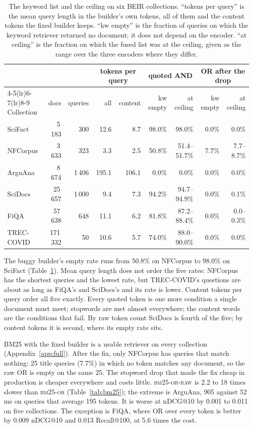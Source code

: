 \documentclass[11pt]{article}
\begin{document}
\begin{table}[h]
\centering
\small
\setlength{\tabcolsep}{4pt}
\begin{tabular}{lrrrrrrrr}
\toprule
 & & & \multicolumn{2}{c}{tokens per query} & \multicolumn{2}{c}{quoted AND} & \multicolumn{2}{c}{OR after the drop} \\
\cmidrule(lr){4-5}\cmidrule(lr){6-7}\cmidrule(lr){8-9}
Collection & docs & queries & all & content & kw empty & at ceiling & kw empty & at ceiling \\
\midrule
SciFact & 5\,183 & 300 & 12.6 & 8.7 & 98.0\% & 98.0\% & 0.0\% & 0.0\% \\
NFCorpus & 3\,633 & 323 & 3.3 & 2.5 & 50.8\% & 51.4--51.7\% & 7.7\% & 7.7--8.7\% \\
ArguAna & 8\,674 & 1\,406 & 195.1 & 106.1 & 0.0\% & 0.0\% & 0.0\% & 0.0\% \\
SciDocs & 25\,657 & 1\,000 & 9.4 & 7.3 & 94.2\% & 94.7--94.9\% & 0.0\% & 0.1\% \\
FiQA & 57\,638 & 648 & 11.1 & 6.2 & 81.8\% & 87.2--88.4\% & 0.0\% & 0.0--0.3\% \\
TREC-COVID & 171\,332 & 50 & 10.6 & 5.7 & 74.0\% & 88.0--90.0\% & 0.0\% & 0.0\% \\
\bottomrule
\end{tabular}
\caption{The keyword list and the ceiling on six BEIR collections. ``tokens per query'' is the mean query length in the builder's own tokens, all of them and the content tokens the fixed builder keeps. ``kw empty'' is the fraction of queries on which the keyword retriever returned no document; it does not depend on the encoder. ``at ceiling'' is the fraction on which the fused list was at the ceiling, given as the range over the three encoders where they differ.}
\label{tab:legs}
\end{table}

The buggy builder's empty rate runs from 50.8\% on NFCorpus to 98.0\% on SciFact (Table~\ref{tab:legs}). Mean query length does not order the five rates: NFCorpus has the shortest queries and the lowest rate, but TREC-COVID's questions are about as long as FiQA's and SciDocs's and its rate is lower. Content tokens per query order all five exactly. Every quoted token is one more condition a single document must meet; stopwords are met almost everywhere; the content words are the conditions that fail. By raw token count SciDocs is fourth of the five; by content tokens it is second, where its empty rate sits.

BM25 with the fixed builder is a usable retriever on every collection (Appendix~\ref{app:full}). After the fix, only NFCorpus has queries that match nothing: 25 title queries (7.7\%) in which no token matches any document, so the raw OR is empty on the same 25. The stopword drop that made the fix cheap in production is cheaper everywhere and costs little. \textsc{bm25-or-raw} is 2.2 to 18 times slower than \textsc{bm25-or} (Table~\ref{tab:bm25}); the extreme is ArguAna, 905 against 52\,ms on queries that average 195 tokens. It is worse at nDCG@10 by 0.001 to 0.011 on five collections. The exception is FiQA, where OR over every token is better by 0.009 nDCG@10 and 0.013 Recall@100, at 5.6 times the cost.
\end{document}
